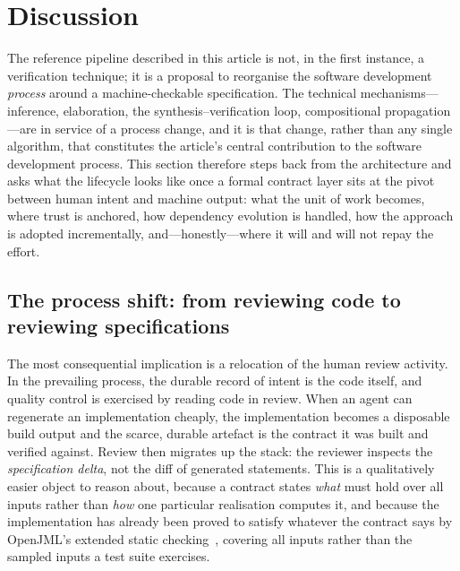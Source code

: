 \section{Discussion}\label{sec:discussion}

The reference pipeline described in this article is not, in the first instance,
a verification technique; it is a proposal to reorganise the software
development \emph{process} around a machine-checkable specification. The
technical mechanisms---inference, elaboration, the synthesis--verification
loop, compositional propagation---are in service of a process change, and it is
that change, rather than any single algorithm, that constitutes the
article's central contribution to the software development process. This section therefore steps back from
the architecture and asks what the lifecycle looks like once a formal contract
layer sits at the pivot between human intent and machine output: what the unit
of work becomes, where trust is anchored, how dependency evolution is handled,
how the approach is adopted incrementally, and---honestly---where it will and
will not repay the effort.

\subsection{The process shift: from reviewing code to reviewing
specifications}\label{subsec:disc-processshift}

The most consequential implication is a relocation of the human review
activity. In the prevailing process, the durable record of intent is the code
itself, and quality control is exercised by reading code in review. When an
agent can regenerate an implementation cheaply, the implementation becomes a
disposable build output and the scarce, durable artefact is the contract it was
built and verified against. Review then migrates up the stack: the reviewer
inspects the \emph{specification delta}, not the diff of generated statements.
This is a qualitatively easier object to reason about, because a contract states
\emph{what} must hold over all inputs rather than \emph{how} one particular
realisation computes it, and because the implementation has already been proved
to satisfy whatever the contract says by OpenJML's extended static
checking~\cite{cok2014openjml}, covering all inputs rather than the sampled
inputs a test suite exercises.

